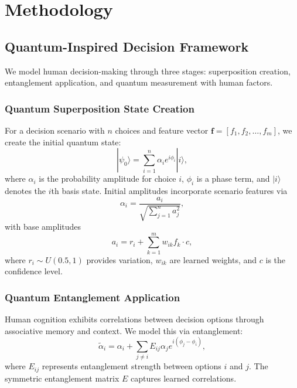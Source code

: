 \documentclass[conference]{IEEEtran}
\begin{document}
\section{Methodology}

\subsection{Quantum-Inspired Decision Framework}

We model human decision-making through three stages: superposition creation, entanglement application, and quantum measurement with human factors.

\subsubsection{Quantum Superposition State Creation}

For a decision scenario with $n$ choices and feature vector $\mathbf{f} = [f_1, f_2, \ldots, f_m]$, we create the initial quantum state:
\begin{equation}
|\psi_0\rangle = \sum_{i=1}^{n} \alpha_i e^{i\phi_i} |i\rangle,
\end{equation}
where $\alpha_i$ is the probability amplitude for choice $i$, $\phi_i$ is a phase term, and $|i\rangle$ denotes the $i$th basis state. Initial amplitudes incorporate scenario features via
\begin{equation}
\alpha_i = \frac{a_i}{\sqrt{\sum_{j=1}^n a_j^2}},
\end{equation}
with base amplitudes
\begin{equation}
a_i = r_i + \sum_{k=1}^{m} w_{ik} f_k \cdot c,
\end{equation}
where $r_i \sim U(0.5, 1)$ provides variation, $w_{ik}$ are learned weights, and $c$ is the confidence level.

\subsubsection{Quantum Entanglement Application}

Human cognition exhibits correlations between decision options through associative memory and context. We model this via entanglement:
\begin{equation}
\tilde{\alpha}_i = \alpha_i + \sum_{j \neq i} E_{ij} \alpha_j e^{i(\phi_j - \phi_i)},
\end{equation}
where $E_{ij}$ represents entanglement strength between options $i$ and $j$. The symmetric entanglement matrix $E$ captures learned correlations.
\end{document}
